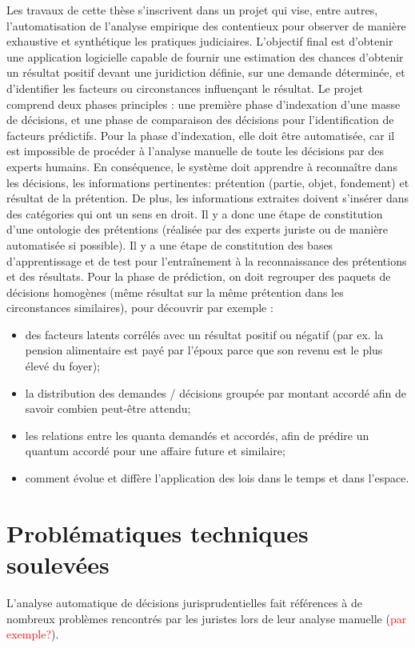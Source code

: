 Les travaux de cette thèse s'inscrivent dans un projet qui vise, entre autres, l'automatisation de l'analyse empirique des contentieux pour observer de manière exhaustive et synthétique les pratiques judiciaires. L'objectif final est d'obtenir une application logicielle capable de fournir une estimation des chances d'obtenir un résultat positif devant une juridiction définie, sur une demande déterminée, et d'identifier les facteurs ou circonstances influençant le résultat. Le projet comprend deux phases principles : une première phase d'indexation d'une masse de décisions, et une phase de comparaison des décisions pour l'identification de facteurs prédictifs. Pour la phase d'indexation, elle doit être automatisée, car il est impossible de procéder à l'analyse manuelle de toute les décisions par des experts humains. En conséquence, le système doit apprendre à reconnaître dans les décisions, les informations pertinentes: prétention (partie, objet, fondement) et résultat de la prétention. De plus, les informations extraites doivent s'insérer dans des catégories qui ont un sens en droit. Il y a donc une étape de constitution d'une ontologie des prétentions (réalisée par des experts juriste ou de manière automatisée si possible). Il y a une étape de constitution des bases d'apprentissage et de test pour l'entraînement à la reconnaissance des prétentions et des résultats.
Pour la phase de prédiction, on doit regrouper des paquets de décisions homogènes (même résultat sur la même prétention dans les circonstances similaires), pour découvrir par exemple : 
\begin{itemize}
    \item des facteurs latents corrélés avec un résultat positif ou négatif (par ex. la pension alimentaire est payé par l'époux parce que son revenu est le plus élevé du foyer);
    \item la distribution des demandes / décisions groupée par montant accordé afin de savoir combien peut-être attendu;
    \item les relations entre les quanta demandés et accordés, afin de prédire un quantum accordé pour une affaire future et similaire;
    \item comment évolue et diffère l'application des lois dans le temps et dans l'espace.
\end{itemize}

\section{Problématiques techniques soulevées}
\label{sec:intro:probleme}
L'analyse automatique de décisions jurisprudentielles fait références à de nombreux problèmes rencontrés par les juristes lors de leur analyse manuelle (\textcolor{red}{par exemple?}). 

